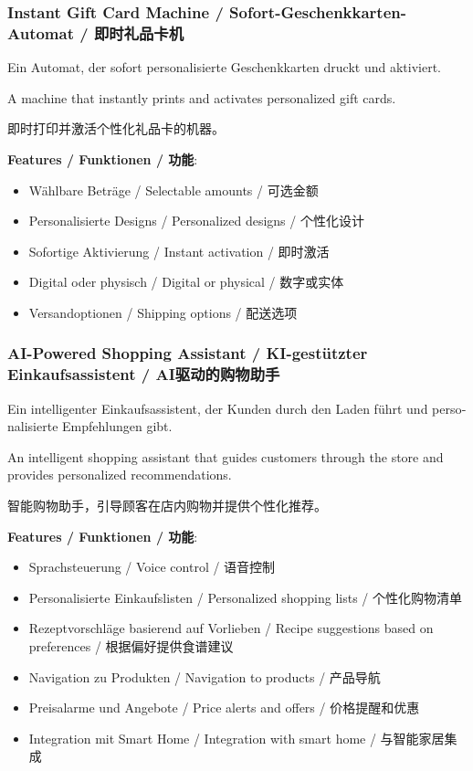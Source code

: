 \subsubsection{Instant Gift Card Machine / Sofort-Geschenkkarten-Automat / 即时礼品卡机}

\begin{otherlanguage}{ngerman}
Ein Automat, der sofort personalisierte Geschenkkarten druckt und aktiviert.
\end{otherlanguage}

A machine that instantly prints and activates personalized gift cards.

即时打印并激活个性化礼品卡的机器。

\textbf{Features / Funktionen / 功能}:
\begin{itemize}
    \item Wählbare Beträge / Selectable amounts / 可选金额
    \item Personalisierte Designs / Personalized designs / 个性化设计
    \item Sofortige Aktivierung / Instant activation / 即时激活
    \item Digital oder physisch / Digital or physical / 数字或实体
    \item Versandoptionen / Shipping options / 配送选项
\end{itemize}

\subsubsection{AI-Powered Shopping Assistant / KI-gestützter Einkaufsassistent / AI驱动的购物助手}

\begin{otherlanguage}{ngerman}
Ein intelligenter Einkaufsassistent, der Kunden durch den Laden führt und personalisierte Empfehlungen gibt.
\end{otherlanguage}

An intelligent shopping assistant that guides customers through the store and provides personalized recommendations.

智能购物助手，引导顾客在店内购物并提供个性化推荐。

\textbf{Features / Funktionen / 功能}:
\begin{itemize}
    \item Sprachsteuerung / Voice control / 语音控制
    \item Personalisierte Einkaufslisten / Personalized shopping lists / 个性化购物清单
    \item Rezeptvorschläge basierend auf Vorlieben / Recipe suggestions based on preferences / 根据偏好提供食谱建议
    \item Navigation zu Produkten / Navigation to products / 产品导航
    \item Preisalarme und Angebote / Price alerts and offers / 价格提醒和优惠
    \item Integration mit Smart Home / Integration with smart home / 与智能家居集成
\end{itemize}

